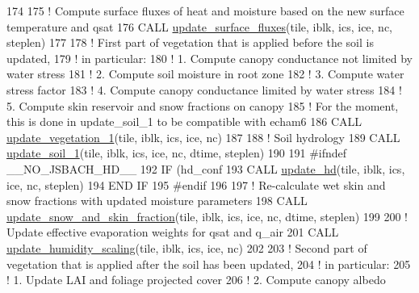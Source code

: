 \begin{DoxyCode}
{174 
175     \textcolor{comment}{! Compute surface fluxes of heat and moisture based on the new surface temperature and qsat}
176     \textcolor{keyword}{CALL }\hyperlink{namespacemo__srf__interface_acdac2acc6bb50d7ecc7dea28ea5b3e87}{update\_surface\_fluxes}(tile, iblk, ics, ice, nc, steplen)
177 
178     \textcolor{comment}{! First part of vegetation that is applied before the soil is updated,}
179     \textcolor{comment}{! in particular:}
180     \textcolor{comment}{! 1. Compute canopy conductance not limited by water stress}
181     \textcolor{comment}{! 2. Compute soil moisture in root zone}
182     \textcolor{comment}{! 3. Compute water stress factor}
183     \textcolor{comment}{! 4. Compute canopy conductance limited by water stress}
184     \textcolor{comment}{! 5. Compute skin reservoir and snow fractions on canopy}
185     \textcolor{comment}{!    For the moment, this is done in update\_soil\_1 to be compatible with echam6}
186     \textcolor{keyword}{CALL }\hyperlink{namespacemo__veg__interface_a3663bc9118551ffb7d52763535228d89}{update\_vegetation\_1}(tile, iblk, ics, ice, nc)
187 
188     \textcolor{comment}{! Soil hydrology}
189     \textcolor{keyword}{CALL }\hyperlink{namespacemo__soil__interface_ae4d0b6e8f65eeda1006776c05f071a85}{update\_soil\_1}(tile, iblk, ics, ice, nc, dtime, steplen)
190 
191 \textcolor{preprocessor}{#ifndef \_\_NO\_JSBACH\_HD\_\_}
192 \textcolor{preprocessor}{}    \textcolor{keywordflow}{IF} (hd\_conf%
193       \textcolor{keyword}{CALL }\hyperlink{namespacemo__hd__interface_a9c78647e6d4247940081f0f4cb58732c}{update\_hd}(tile, iblk, ics, ice, nc, steplen)
194 \textcolor{keywordflow}{    END IF}
195 \textcolor{preprocessor}{#endif}
196 \textcolor{preprocessor}{}
197     \textcolor{comment}{! Re-calculate wet skin and snow fractions with updated moisture parameters}
198     \textcolor{keyword}{CALL  }\hyperlink{namespacemo__srf__interface_ac20b7f42f80cf50fcae6c709a2c70f8f}{update\_snow\_and\_skin\_fraction}(tile, iblk, ics, ice, nc, dtime, 
      steplen)
199 
200     \textcolor{comment}{! Update effective evaporation weights for qsat and q\_air}
201     \textcolor{keyword}{CALL }\hyperlink{namespacemo__srf__interface_a5b41ccc70c29c3591021f628805678fa}{update\_humidity\_scaling}(tile, iblk, ics, ice, nc)
202 
203     \textcolor{comment}{! Second part of vegetation that is applied after the soil has been updated,}
204     \textcolor{comment}{! in particular:}
205     \textcolor{comment}{! 1. Update LAI and foliage projected cover}
206     \textcolor{comment}{! 2. Compute canopy albedo}
}
\end{DoxyCode}
